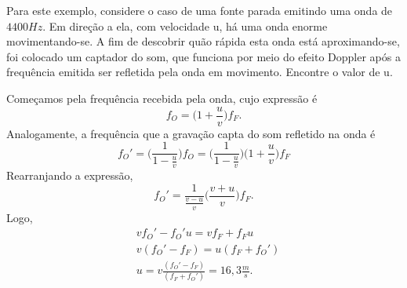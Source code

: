 \documentclass[phsyicsII_notes.tex]{subfiles}
\begin{document}
\begin{example}
	Para este exemplo, considere o caso de uma fonte parada emitindo uma onda de \(4400Hz\). Em direção a ela, com velocidade u, há uma onda enorme movimentando-se.
	A fim de descobrir quão rápida esta onda está aproximando-se, foi colocado um captador do som, que funciona por meio do efeito Doppler após a frequência emitida ser refletida
	pela onda em movimento. Encontre o valor de u.

	Começamos pela frequência recebida pela onda, cujo expressão é
	\[
		f_{O} = \biggl(1 + \frac{u}{v}\biggr)f_{F}.
	\]
	Analogamente, a frequência que a gravação capta do som refletido na onda é
	\[
		f_{O}' = \biggl(\frac{1}{1-\frac{u}{v}}\biggr)f_{O} = \biggl(\frac{1}{1-\frac{u}{v}}\biggr)\biggl(1+\frac{u}{v}\biggr)f_{F}
	\]
	Rearranjando a expressão,
	\[
		f_{O}' = \frac{1}{\frac{v-u}{v}}\biggl(\frac{v+u}{v}\biggr)f_{F}.
	\]
	Logo,
	\begin{align*}
		 & vf_{O}' - f_{O}'u = vf_{F} + f_{F}u                            \\
		 & v(f_{O}' - f_{F}) = u(f_{F}+f_{O}')                            \\
		 & u = v\frac{(f_{O}'-f_{F})}{(f_{F}+f_{O}')} = 16,3 \frac{m}{s}.
	\end{align*}
\end{example}
\end{document}
